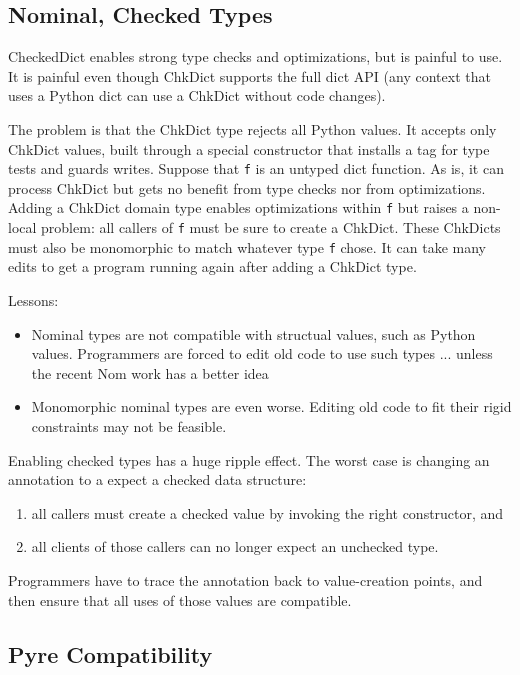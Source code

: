 \documentclass[english,cleveref,submission]{programming}
\newcommand{\code}[1]{\texttt{#1}}
\begin{document}
\subsection{Nominal, Checked Types}
\label{s:concrete-migration}

CheckedDict enables strong type checks and optimizations, but is painful to use.
It is painful even though ChkDict supports the full dict API
(any context that uses a Python dict can use a ChkDict without code changes).

The problem is that the ChkDict type rejects all Python values.
It accepts only ChkDict values, built through a special constructor
that installs a tag for type tests and guards writes.
Suppose that \code{f} is an untyped dict function.
As is, it can process ChkDict but gets no benefit from type checks nor from optimizations.
Adding a ChkDict domain type enables optimizations within \code{f} but raises a non-local
problem: all callers of \code{f} must be sure to create a ChkDict.
These ChkDicts must also be monomorphic to match whatever type \code{f} chose.
It can take many edits to get a program running again after adding a ChkDict type.

Lessons:
\begin{itemize}
  \item
    Nominal types are not compatible with structual values, such as Python values.
    Programmers are forced to edit old code to use such types ... unless the recent Nom work has a better idea~\cite{mt-oopsla-2021}
  \item
    Monomorphic nominal types are even worse.
    Editing old code to fit their rigid constraints may not be feasible.

\end{itemize}

Enabling checked types has a huge ripple effect.
The worst case is changing an annotation to a expect a checked data structure:
\begin{enumerate}
  \item all callers must create a checked value by invoking the right constructor, and
  \item all clients of those callers can no longer expect an unchecked type.
\end{enumerate}
Programmers have to trace the annotation back to value-creation points, and then
ensure that all uses of those values are compatible.


\subsection{Pyre Compatibility}
\end{document}
